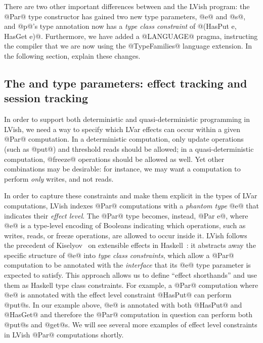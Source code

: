 There are two other important differences between  and the LVish
program: the @Par@ type constructor has gained two new type
parameters, @e@ and @s@, and @p@'s type annotation now has a
\emph{type class constraint} of @(HasPut e, HasGet e)@.  Furthermore,
we have added a @LANGUAGE@ pragma, instructing the compiler that we
are now using the @TypeFamilies@ language extension.  In the following
section,  explain these changes.

\subsection{The  and  type parameters: effect tracking and session tracking}

In order to support both deterministic and quasi-deterministic
programming in LVish, we need a way to specify which LVar effects can
occur within a given @Par@ computation.  In a deterministic
computation, only update operations (such as @put@) and threshold
reads should be allowed; in a quasi-deterministic computation,
@freeze@ operations should be allowed as well.  Yet other combinations
may be desirable: for instance, we may want a computation to perform
\emph{only} writes, and not reads.

In order to capture these constraints and make them explicit in the
types of LVar computations, LVish indexes @Par@ computations with a
\emph{phantom type} @e@ that indicates their \emph{effect level}.  The
@Par@ type becomes, instead, @Par e@, where @e@ is a type-level
encoding of Booleans indicating which operations, such as writes,
reads, or freeze operations, are allowed to occur inside it.  LVish
follows the precedent of Kiselyov \etal~on extensible effects in
Haskell~\cite{oleg-amr-haskell-2013}: it abstracts away the specific
structure of @e@ into \emph{type class constraints}, which allow a
@Par@ computation to be annotated with the \emph{interface} that its
@e@ type parameter is expected to satisfy.  This approach allows us to
define ``effect shorthands'' and use them as Haskell type class
constraints.  For example, a @Par@ computation where @e@ is annotated
with the effect level constraint @HasPut@ can perform @put@s.  In our
example above, @e@ is annotated with both @HasPut@ and @HasGet@ and
therefore the @Par@ computation in question can perform both @put@s
and @get@s.  We will see several more examples of effect level
constraints in LVish @Par@ computations shortly.

